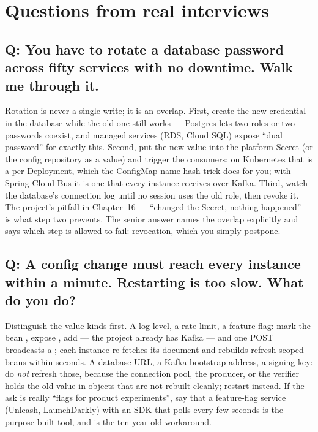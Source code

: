 \section{Questions from real interviews}

\subsection*{Q: You have to rotate a database password across fifty
services with no downtime. Walk me through it.}

Rotation is never a single write; it is an overlap. First, create the
new credential in the database while the old one still works ---
Postgres lets two roles or two passwords coexist, and managed services
(RDS, Cloud SQL) expose ``dual password'' for exactly this. Second, put
the new value into the platform Secret (or the config repository as a
 value) and trigger the consumers: on Kubernetes that
is a  per Deployment, which the ConfigMap
name-hash trick does for you; with Spring Cloud Bus it is one
 that every instance receives over
Kafka. Third, watch the database's connection log until no session uses
the old role, then revoke it. The project's pitfall in Chapter~16 ---
``changed the Secret, nothing happened'' --- is what step two prevents.
The senior answer names the overlap explicitly and says which step is
allowed to fail: revocation, which you simply postpone.

\subsection*{Q: A config change must reach every instance within a
minute. Restarting is too slow. What do you do?}

Distinguish the value kinds first. A log level, a rate limit, a feature
flag: mark the bean , expose
, add 
--- the project already has Kafka --- and one POST broadcasts a
; each instance re-fetches its
document and rebuilds refresh-scoped beans within seconds. A database
URL, a Kafka bootstrap address, a signing key: do \emph{not} refresh
those, because the connection pool, the producer, or the verifier
holds the old value in objects that are not rebuilt cleanly; restart
instead. If the ask is really ``flags for product experiments'', say
that a feature-flag service (Unleash, LaunchDarkly) with an SDK that
polls every few seconds is the purpose-built tool, and
 is the ten-year-old workaround.

